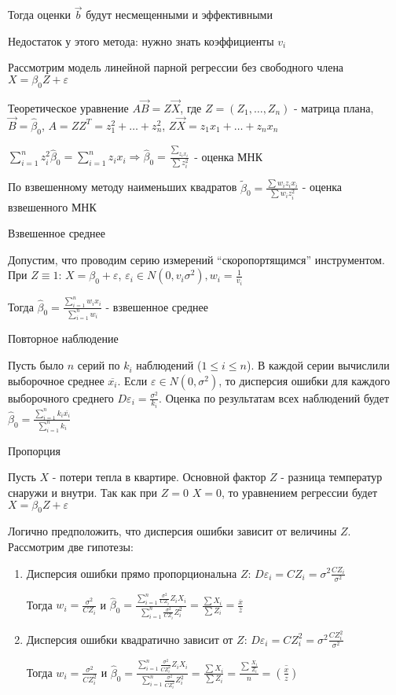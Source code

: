 Тогда оценки $\vec b$ будут несмещенными и эффективными

Недостаток у этого метода: нужно знать коэффициенты $v_i$

\Ex Рассмотрим модель линейной парной регрессии без свободного члена $X = \beta_0 Z + \varepsilon$

Теоретическое уравнение $A \vec B = Z \vec X$, где $Z = \left(Z_1, \dots, Z_n\right)$ - матрица плана, $\vec B = \hat \beta_0$, $A = Z Z^T = z_1^2 + \dots + z_n^2$, $Z \vec X = z_1 x_1 + \dots + z_n x_n$

$\sum_{i = 1}^n z^2_i \hat \beta_0 = \sum_{i = 1}^n z_i x_i \Longrightarrow \hat \beta_0 = \frac{\sum_{z_i x_i}}{\sum z^2_i}$ - оценка МНК 

По взвешенному методу наименьших квадратов $\tilde \beta_0 = \frac{\sum w_i z_i x_i}{\sum w_i z_i^2}$ - оценка взвешенного МНК

 Взвешенное среднее

Допустим, что проводим серию измерений \enquote{скоропортящимся} инструментом. При $Z \equiv 1$: $X = \beta_0 + \varepsilon$, $\varepsilon_i \in N(0, v_i \sigma^2), w_i = \frac{1}{v_i}$

Тогда $\hat \beta_0 = \frac{\sum_{i = 1}^n w_i x_i}{\sum_{i = 1}^n w_i}$ - взвешенное среднее

 Повторное наблюдение

Пусть было $n$ серий по $k_i$ наблюдений ($1 \leq i \leq n$). В каждой серии вычислили выборочное среднее $\overline{x_i}$. 
Если $\varepsilon \in N(0, \sigma^2)$, то дисперсия ошибки для каждого выборочного среднего $D\varepsilon_i = \frac{\sigma^2}{k_i}$. Оценка по результатам всех наблюдений будет $\hat \beta_0 = \frac{\sum_{i = 1}^n k_i \overline{x_i}}{\sum_{i = 1}^n k_i}$

 Пропорция

Пусть $X$ - потери тепла в квартире. Основной фактор $Z$ - разница температур снаружи и внутри. Так как при $Z = 0$ $X = 0$, то уравнением регрессии будет $X = \beta_0 Z + \varepsilon$

Логично предположить, что дисперсия ошибки зависит от величины $Z$. Рассмотрим две гипотезы:

\begin{enumerate}
    \item Дисперсия ошибки прямо пропорциональна $Z$: $D\varepsilon_i = C Z_i = \sigma^2 \frac{C Z_i}{\sigma^2}$

    Тогда $w_i = \frac{\sigma^2}{C Z_i}$ и $\hat \beta_0 = \frac{\sum_{i = 1}^n \frac{\sigma^2}{C Z_i} Z_i X_i}{\sum_{i = 1}^n \frac{\sigma^2}{C Z_i} Z_i^2} = \frac{\sum X_i}{\sum Z_i} = \frac{\overline{x}}{\overline{z}}$

    \item Дисперсия ошибки квадратично зависит от $Z$: $D\varepsilon_i = C Z_i^2 = \sigma^2 \frac{C Z_i^2}{\sigma^2}$

    Тогда $w_i = \frac{\sigma^2}{C Z_i^2}$ и $\hat \beta_0 = \frac{\sum_{i = 1}^n \frac{\sigma^2}{C Z_i^2} Z_i X_i}{\sum_{i = 1}^n \frac{\sigma^2}{C Z_i^2} Z_i^2} = \frac{\sum X_i}{\sum Z_i} = \frac{\sum \frac{X_i}{Z_i}}{n} = \overline{\left(\frac{x}{z}\right)}$
\end{enumerate}


